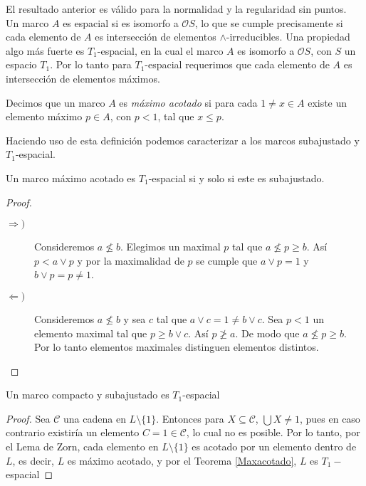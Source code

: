 El resultado anterior es válido para la normalidad y la regularidad sin puntos.\\

Un marco $A$ es espacial si es isomorfo a $\mathcal{O}S$, lo que se cumple precisamente si cada elemento de $A$ es intersección de elementos $\wedge$-irreducibles. Una propiedad algo más fuerte es $T_1$-espacial, en la cual el marco $A$ es isomorfo a $\mathcal{O}S$, con $S$ un espacio $T_1$. Por lo tanto para $T_1$-espacial requerimos que cada elemento de $A$ es intersección de elementos máximos.

\begin{dfn}\label{Maximoacotado}
    Decimos que un marco $A$ es \emph{máximo acotado} si para cada $1\neq x\in A$ existe un elemento máximo $p\in A$, con $p< 1$, tal que $x\leq p$.
\end{dfn}

Haciendo uso de esta definición podemos caracterizar a los marcos subajustado y $T_1$-espacial.

\begin{thm}\label{Maxacotado}
    Un marco máximo acotado es $T_1$-espacial si y solo si este es subajustado.
\end{thm}

\begin{proof}
    \begin{description}
        \item[$\Rightarrow )$] Consideremos $a\nleq b$. Elegimos un maximal $p$ tal que $a\nleq p \geq b$. Así $p< a\vee p$  y por la maximalidad de $p$ se cumple que $a\vee p=1$ y $b\vee p=p\neq 1$. 
       
        \item[$\Leftarrow )$] Consideremos $a\nleq b$ y sea $c$ tal que $a\vee c=1\neq b\vee c$. Sea  
        $p< 1$ un elemento maximal tal que $p\geq b\vee c$. Así $p\ngeq a$. De modo que $a\nleq p \geq b$. Por lo tanto elementos maximales distinguen elementos distintos.
    \end{description}
\end{proof}

\begin{thm}\label{EspecializacionIsbell}
    Un marco compacto y subajustado es $T_1$-espacial
\end{thm}

\begin{proof}
    Sea $\mathcal{C}$ una cadena en $L\setminus \{1\}$. Entonces para $X\subseteq \mathcal{C}$, $\bigcup X\neq 1$, pues en caso contrario existiría un elemento $C=1\in \mathcal{C}$, lo cual no es posible. Por lo tanto, por el Lema de Zorn, cada elemento en $L\setminus \{1\}$ es acotado por un elemento dentro de $L$, es decir, $L$ es máximo acotado, y por el Teorema \ref{Maxacotado}, $L$ es $T_1-$espacial
\end{proof}


